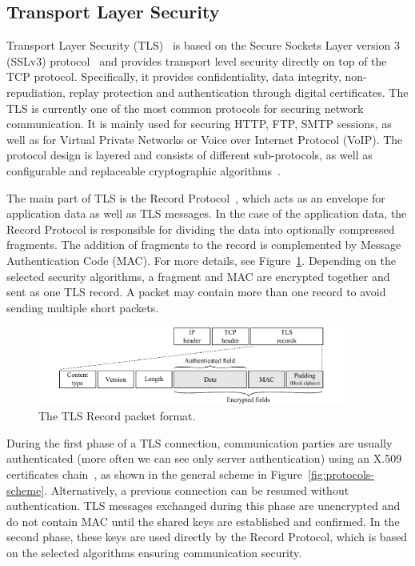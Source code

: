 
\subsection{Transport Layer Security}
Transport Layer Security (TLS)~\cite{rfc5246} is based on the Secure Sockets Layer version 3 (SSLv3) protocol~\cite{rfc6101} and provides transport level security directly on top of the TCP protocol. Specifically, it provides confidentiality, data integrity, non-repudiation, replay protection and authentication through digital certificates. The TLS is currently one of the most common protocols for securing network communication. It is mainly used for securing HTTP, FTP, SMTP sessions, as well as for Virtual Private Networks or Voice over Internet Protocol (VoIP). The protocol design is layered and consists of different sub-protocols, as well as configurable and replaceable cryptographic algorithms~\cite{tls-thesis}.

The main part of TLS is the Record Protocol~\cite{rfc5246}, which acts as an envelope for application data as well as TLS messages. In the case of the application data, the Record Protocol is responsible for dividing the data into optionally compressed fragments. The addition of fragments to the record is complemented by Message Authentication Code (MAC). For more details, see Figure~\ref{fig:tls-record}. Depending on the selected security algorithms, a fragment and MAC are encrypted together and sent as one TLS record. A packet may contain more than one record to avoid sending multiple short packets.

\begin{figure}[!ht]
	\begin{center}
		\includegraphics[width=0.9\textwidth]{figures/tls_record}
		\caption{The TLS Record packet format.} \label{fig:tls-record}
	\end{center}
\end{figure}

During the first phase of a TLS connection, communication parties are usually authenticated (more often we can see only server authentication) using an X.509 certificates chain~\cite{rfc5280}, as shown in the general scheme in Figure~\ref{fig:protocols-scheme}. Alternatively, a previous connection can be resumed without authentication. TLS messages exchanged during this phase are unencrypted and do not contain MAC until the shared keys are established and confirmed. In the second phase, these keys are used directly by the Record Protocol, which is based on the selected algorithms ensuring communication security.

